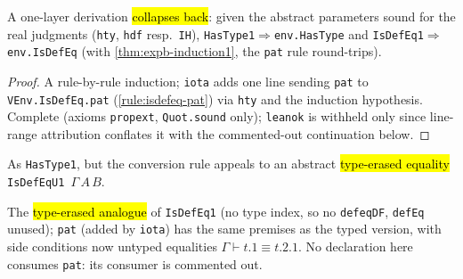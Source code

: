 \begin{lemma}
\label{thm:expb-isdefeq1-induction}
\leanok
{}

 A one-layer derivation \hl{collapses back}: given the abstract parameters sound for
the real judgments (\texttt{hty}, \texttt{hdf} resp.\ \texttt{IH}),
\texttt{HasType1}$\Rightarrow$\texttt{env.HasType} and \texttt{IsDefEq1}$\Rightarrow$
\texttt{env.IsDefEq} (with \ref{thm:expb-induction1}, the \texttt{pat} rule round-trips).
\end{lemma}
\begin{proof}
 A rule-by-rule induction; \texttt{iota} adds one line sending \texttt{pat} to
\texttt{VEnv.IsDefEq.pat} (\ref{rule:isdefeq-pat}) via \texttt{hty} and the induction hypothesis.
 Complete (axioms \texttt{propext}, \texttt{Quot.sound} only); \texttt{leanok} is
withheld only since line-range attribution conflates it with the commented-out continuation below.
\end{proof}

\begin{definition}
\label{inductive:expb-hastypeu1}
\leanok
{}

 As \texttt{HasType1}, but the conversion rule appeals to an abstract
\hl{type-erased equality} \texttt{IsDefEqU1}~$\Gamma\,A\,B$.
\end{definition}

\begin{definition}
\label{inductive:expb-isdefequ1}
\leanok
{}

 The \hl{type-erased analogue} of \texttt{IsDefEq1} (no type index, so no
\texttt{defeqDF}, \texttt{defEq} unused); \texttt{pat} (added by \texttt{iota}) has the same
premises as the typed version, with side conditions now untyped equalities
$\Gamma\vdash t.1\equiv t.2.1$.
 No declaration here consumes \texttt{pat}: its consumer is commented out.
\end{definition}

